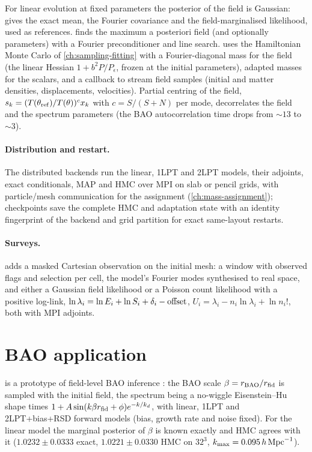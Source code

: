 For linear evolution at fixed parameters the posterior of the field is Gaussian:  gives the exact mean, the Fourier covariance and the
field-marginalised likelihood, used as references.  finds the maximum a posteriori field (and optionally parameters) with a Fourier preconditioner and
line search.  uses the Hamiltonian Monte Carlo of \cref{ch:sampling-fitting} \cite{Duane1987,Neal2011} with a Fourier-diagonal mass for the field (the
linear Hessian $1+b^2P/P_\epsilon$, frozen at the initial parameters), adapted masses for the scalars, and a callback to stream field samples (initial and matter
densities, displacements, velocities). Partial centring of the field, $s_k=(T(\theta_{\rm ref})/T(\theta))^cx_k$ with $c=S/(S+N)$ per mode, decorrelates the field and
the spectrum parameters (the BAO autocorrelation time drops from $\sim13$ to $\sim3$).

\paragraph*{Distribution and restart.} The distributed backends run the linear, 1LPT and 2LPT models, their adjoints, exact conditionals, MAP and HMC over MPI on slab
or pencil grids, with particle/mesh communication for the assignment (\cref{ch:mass-assignment}); checkpoints save the complete HMC and adaptation state with an identity
fingerprint of the backend and grid partition for exact same-layout restarts.

\paragraph*{Surveys.}  adds a masked Cartesian observation on the initial mesh: a window with observed flags and selection per cell, the model's
Fourier modes synthesised to real space, and either a Gaussian field likelihood or a Poisson count likelihood with a positive log-link,
$\ln\lambda_i=\ln E_i+\ln S_i+\delta_i-{\rm offset}$, $U_i=\lambda_i-n_i\ln\lambda_i+\ln n_i!$, both with MPI adjoints.

\section{BAO application}\label{sec:fl-bao}

 is a prototype of field-level BAO inference \cite{Babic2024}: the BAO scale $\beta=r_{\rm BAO}/r_{\rm fid}$ is sampled with the initial field, the
spectrum being a no-wiggle Eisenstein--Hu shape times $1+A\sin(k\beta r_{\rm fid}+\phi)e^{-k/k_d}$, with linear, 1LPT and 2LPT+bias+RSD forward models (bias, growth
rate and noise fixed). For the linear model the marginal posterior of $\beta$ is known exactly and HMC agrees with it ($1.0232\pm0.0333$ exact, $1.0221\pm0.0330$ HMC on
$32^3$, $k_{\max}=0.095\,h\,\mathrm{Mpc}^{-1}$).

